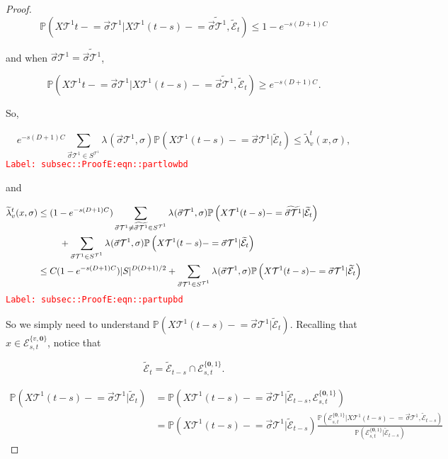 \documentclass[12pt]{article}
\newcommand{\mb}{\mathbb}
\newcommand{\mc}{\mathcal}
\newcommand{\tr}{\textcolor{red}}
\newcommand{\labe}[1]{\tr{\texttt{Label: #1}}}
\newcommand{\pr}{\mb{P}}							%
\renewcommand{\root}{\mathbf{0}}				%
\renewcommand{\v}{v}							%
\renewcommand{\S}{S}							%
\newcommand{\s}{\sigma}							%
\newcommand{\sv}{\vec{\s}}						%
\newcommand{\x}{x}								%
\renewcommand{\t}{t}							%
\renewcommand{\tt}{s}							%
\newcommand{\X}{X}								%
\newcommand{\degr}{D}								%
\newcommand{\pup}[1]{^{#1}}							%
\newcommand{\tree}{\mc{T}}							%
\newcommand{\XState}[1]{\S^{#1}}				%
\newcommand{\rate}[1]{\lambda_{#1}}					%
\newcommand{\crate}[2]{\alt{\lambda}_{#1}^{#2}}		%
\newcommand{\const}[1]{C_{#1}}						%
\newcommand{\alt}{\widetilde}						%
\newcommand{\evnt}{\mc{E}}						%
\begin{document}
\begin{proof}
\[\pr\left(\X{\tree\pup{1}}{\t-} = \sv{}{\tree\pup{1}}|\X{\tree\pup{1}}{(\t-\tt)-}=\alt{\sv{}{\tree\pup{1}}},\alt{\evnt}_\t\right) \leq 1-e^{-\tt(\degr+1)\const{}}\]

and when \(\sv{}{\tree\pup{1}}=\alt{\sv{}{\tree\pup{1}}}\),

\[\pr\left(\X{\tree\pup{1}}{\t-} = \sv{}{\tree\pup{1}}|\X{\tree\pup{1}}{(\t-\tt)-}=\alt{\sv{}{\tree\pup{1}}},\alt{\evnt}_\t\right) \geq e^{-\tt(\degr+1)\const{}}.\]

So,

\begin{equation}
e^{-\tt(\degr+1)\const{}}\sum_{\sv{}{\tree\pup{1}}\in \S^{\tree\pup{1}}} \rate{}(\sv{}{\tree\pup{1}},\s)\pr\left(\X{\tree\pup{1}}{(\t-\tt)-}=\sv{}{\tree\pup{1}}|\alt{\evnt}_\t\right) \leq \crate{\v}{\t}(\x{}{},\s),
\label{subsec::ProofE:eqn::partlowbd}
\end{equation}
\labe{subsec::ProofE:eqn::partlowbd}

and

\begin{align}
\crate{\v}{\t}(\x{}{},\s)&\leq (1 - e^{-\tt(\degr+1)\const{}})\sum_{\sv{}{\tree\pup{1}}\neq \alt{\sv{}{\tree\pup{1}}} \in \S^{\tree\pup{1}}} \rate{}(\sv{}{\tree\pup{1}},\s)\pr\left(\X{\tree\pup{1}}{(\t-\tt)-}=\alt{\sv{}{\tree\pup{1}}}|\alt{\evnt}_\t\right)\nonumber\\
&\hspace{24 pt} +\sum_{\sv{}{\tree\pup{1}} \in \S^{\tree\pup{1}}} \rate{}(\sv{}{\tree\pup{1}},\s)\pr\left(\X{\tree\pup{1}}{(\t-\tt)-}=\sv{}{\tree\pup{1}}|\alt{\evnt}_\t\right)\nonumber\\
&\leq \const{}(1 - e^{-\tt(\degr+1)\const{}})|\S|^{\degr(\degr+1)/2} + \sum_{\sv{}{\tree\pup{1}} \in \S^{\tree\pup{1}}} \rate{}(\sv{}{\tree\pup{1}},\s)\pr\left(\X{\tree\pup{1}}{(\t-\tt)-}=\sv{}{\tree\pup{1}}|\alt{\evnt}_\t\right)
\label{subsec::ProofE:eqn::partupbd}
\end{align}
\labe{subsec::ProofE:eqn::partupbd}

So we simply need to understand \(\pr\left(\X{\tree\pup{1}}{(\t-\tt)-}=\sv{}{\tree\pup{1}}|\alt{\evnt}_\t\right)\). Recalling that \(\x{}{} \in \evnt^{\{\v,\root\}}_{\tt,\t}\), notice that

\[\alt{\evnt}_\t = \alt{\evnt}_{\t-\tt}\cap \evnt^{\{\root,1\}}_{\tt,\t}.\]

\begin{align*}
\pr\left(\X{\tree\pup{1}}{(\t-\tt)-}=\sv{}{\tree\pup{1}}|\alt{\evnt}_\t\right) &= \pr\left(\X{\tree\pup{1}}{(\t-\tt)-}=\sv{}{\tree\pup{1}}|\alt{\evnt}_{\t-\tt},\evnt^{\{\root,1\}}_{\tt,\t}\right)\\
&=\pr\left(\X{\tree\pup{1}}{(\t-\tt)-}=\sv{}{\tree\pup{1}}|\alt{\evnt}_{\t-\tt}\right)\frac{\pr\left(\evnt^{\{\root,1\}}_{\tt,\t}|\X{\tree\pup{1}}{(\t-\tt)-}=\sv{}{\tree\pup{1}},\alt{\evnt}_{\t-\tt}\right)}{\pr\left(\evnt^{\{\root,1\}}_{\tt,\t}|\alt{\evnt}_{\t-\tt}\right)}
\end{align*}


\end{proof}
\end{document}
